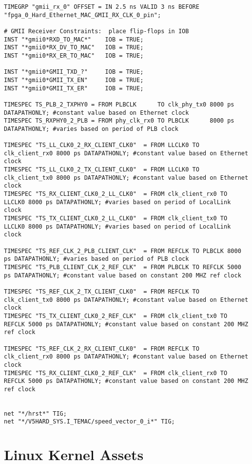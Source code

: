 \begin{verbatim}
TIMEGRP "gmii_rx_0" OFFSET = IN 2.5 ns VALID 3 ns BEFORE "fpga_0_Hard_Ethernet_MAC_GMII_RX_CLK_0_pin";

# GMII Receiver Constraints:  place flip-flops in IOB
INST "*gmii0*RXD_TO_MAC*"    IOB = TRUE;
INST "*gmii0*RX_DV_TO_MAC"   IOB = TRUE;
INST "*gmii0*RX_ER_TO_MAC"   IOB = TRUE;

INST "*gmii0*GMII_TXD_?"     IOB = TRUE;
INST "*gmii0*GMII_TX_EN"     IOB = TRUE;
INST "*gmii0*GMII_TX_ER"     IOB = TRUE;

TIMESPEC TS_PLB_2_TXPHY0 = FROM PLBCLK      TO clk_phy_tx0 8000 ps DATAPATHONLY; #constant value based on Ethernet clock
TIMESPEC TS_RXPHY0_2_PLB = FROM phy_clk_rx0 TO PLBCLK      8000 ps DATAPATHONLY; #varies based on period of PLB clock

TIMESPEC "TS_LL_CLK0_2_RX_CLIENT_CLK0"  = FROM LLCLK0 TO clk_client_rx0 8000 ps DATAPATHONLY; #constant value based on Ethernet clock
TIMESPEC "TS_LL_CLK0_2_TX_CLIENT_CLK0"  = FROM LLCLK0 TO clk_client_tx0 8000 ps DATAPATHONLY; #constant value based on Ethernet clock
TIMESPEC "TS_RX_CLIENT_CLK0_2_LL_CLK0"  = FROM clk_client_rx0 TO LLCLK0 8000 ps DATAPATHONLY; #varies based on period of LocalLink clock
TIMESPEC "TS_TX_CLIENT_CLK0_2_LL_CLK0"  = FROM clk_client_tx0 TO LLCLK0 8000 ps DATAPATHONLY; #varies based on period of LocalLink clock

TIMESPEC "TS_REF_CLK_2_PLB_CLIENT_CLK"  = FROM REFCLK TO PLBCLK 8000 ps DATAPATHONLY; #varies based on period of PLB clock
TIMESPEC "TS_PLB_CLIENT_CLK_2_REF_CLK"  = FROM PLBCLK TO REFCLK 5000 ps DATAPATHONLY; #constant value based on constant 200 MHZ ref clock

TIMESPEC "TS_REF_CLK_2_TX_CLIENT_CLK0"  = FROM REFCLK TO clk_client_tx0 8000 ps DATAPATHONLY; #constant value based on Ethernet clock
TIMESPEC "TS_TX_CLIENT_CLK0_2_REF_CLK"  = FROM clk_client_tx0 TO REFCLK 5000 ps DATAPATHONLY; #constant value based on constant 200 MHZ ref clock

TIMESPEC "TS_REF_CLK_2_RX_CLIENT_CLK0"  = FROM REFCLK TO clk_client_rx0 8000 ps DATAPATHONLY; #constant value based on Ethernet clock
TIMESPEC "TS_RX_CLIENT_CLK0_2_REF_CLK"  = FROM clk_client_rx0 TO REFCLK 5000 ps DATAPATHONLY; #constant value based on constant 200 MHZ ref clock


net "*/hrst*" TIG;
net "*/V5HARD_SYS.I_TEMAC/speed_vector_0_i*" TIG;
\end{verbatim}

\chapter{Linux Kernel Assets}

